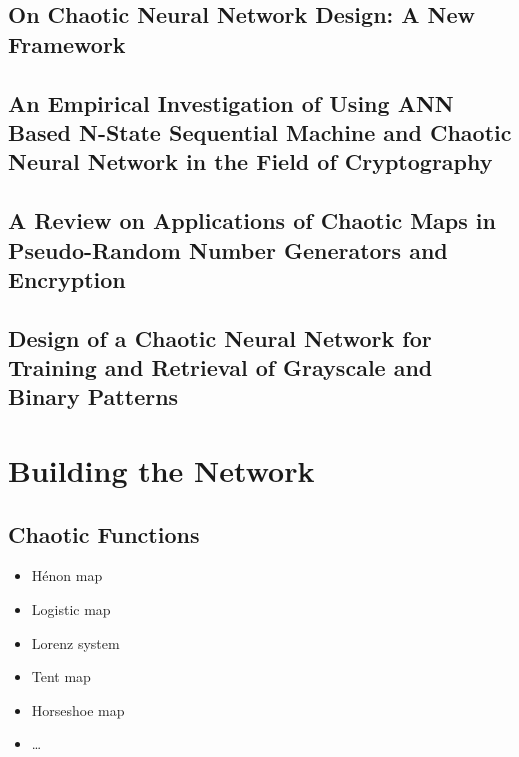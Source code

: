 \documentclass[conference]{IEEEtran}
\begin{document}
\subsection*{\textbf{On Chaotic Neural Network Design: A New Framework}}\label{subsec:on-chaotic-neural-network-design:-a-new-framework}\cite{Qin2017}

\subsection*{\textbf{An Empirical Investigation of Using ANN Based N-State Sequential Machine and Chaotic Neural Network in the Field of Cryptography}}\label{subsec:an-empirical-investigation-of-using-ann-based-n-state-sequential-machine-and-chaotic-neural-network-in-the-field-of-cryptography}\cite{Shukla2012}

\subsection*{\textbf{A Review on Applications of Chaotic Maps in Pseudo-Random Number Generators and Encryption}}\label{subsec:a-review-on-applications-of-chaotic-maps-in-pseudo-random-number-generators-and-encryption}\cite{Naik2022}

\subsection*{\textbf{Design of a Chaotic Neural Network for Training and Retrieval of Grayscale and Binary Patterns}}\label{subsec:design-of-a-chaotic-neural-network-for-training-and-retrieval-of-grayscale-and-binary-patterns}\cite{TAHERKHANI20112824}


\section{Building the Network}\label{sec:building-the-network}

\subsection{Chaotic Functions}\label{subsec:chaotic-functions}

\begin{itemize}
    \item Hénon map
    \item Logistic map
    \item Lorenz system
    \item Tent map
    \item Horseshoe map
    \item \ldots
\end{itemize}
\end{document}
